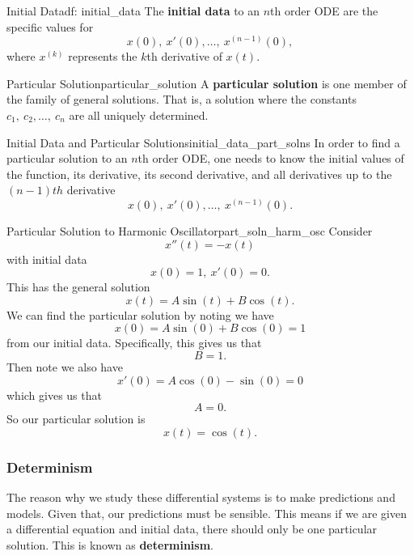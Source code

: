         \begin{df}{Initial Data}{df: initial_data}
            The \textbf{initial data} to an $n$th order ODE are the specific values for
            \[
            x(0),~ x'(0),\dots,~ x^{(n-1)}(0),
            \]
            where $x^{(k)}$ represents the $k$th derivative of $x(t)$.
        \end{df}
        
        \begin{df}{Particular Solution}{particular_solution}
            A \textbf{particular solution} is one member of the family of general solutions.  That is, a solution where the constants $c_1,~c_2,\dots,~c_n$ are all uniquely determined.
        \end{df}
        
        \begin{prop}{Initial Data and Particular Solutions}{initial_data_part_solns}
        In order to find a particular solution to an $n$th order ODE, one needs to know the initial values of the function, its derivative, its second derivative, and all derivatives up to the $(n-1)th$ derivative
        \[
        x(0),~ x'(0),\dots,~ x^{(n-1)}(0).
        \]
        \end{prop}
        
        
        
        \begin{ex}{Particular Solution to Harmonic Oscillator}{part_soln_harm_osc}
        Consider 
        \[
        x''(t)=-x(t)
        \]
        with initial data
        \[
        x(0)=1, ~ x'(0)=0.
        \]
        This has the general solution
        \[
        x(t)=A \sin(t) + B \cos (t).
        \]
        We can find the particular solution by
        noting we have
        \[
        x(0)=A\sin(0)+B\cos(0)=1
        \]
        from our initial data.  Specifically, this gives us that
        \[
        B=1.
        \]
        Then note we also have
        \[
        x'(0)=A\cos (0) - \sin (0)=0
        \]
        which gives us that
        \[
        A=0.
        \]
        So our particular solution is
        \[
        x(t)=\cos (t).
        \]
        \end{ex}
        
        \subsubsection{Determinism}
        The reason why we study these differential systems is to make predictions and models.  Given that, our predictions must be sensible. This means if we are given a differential equation and initial data, there should only be one particular solution.  This is known as \textbf{determinism}.  
        
